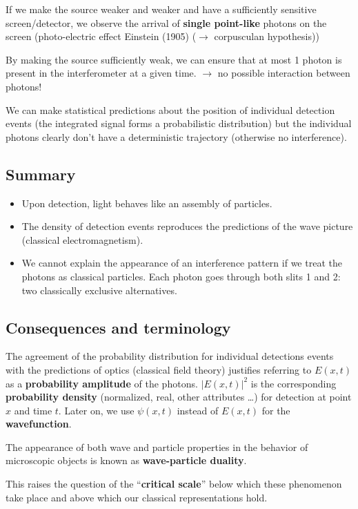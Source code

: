 \noindent
\hft

\noindent
If we make the source weaker and weaker and have a sufficiently sensitive screen/detector, we observe the arrival of \textbf{single point-like} photons on the screen (photo-electric effect Einstein (1905) ($ \to $ corpusculan hypothesis))\par
By making the source sufficiently weak, we can ensure that at most 1 photon is present in the interferometer at a given time. $ \rightarrow $ no possible interaction between photons!\par
\begin{center}
\end{center}
We can make statistical predictions about the position of individual detection events (the integrated signal forms a probabilistic distribution) but the individual photons clearly don't have a deterministic trajectory (otherwise no interference).

\subsection*{Summary}

\begin{itemize}
	\item Upon detection, light behaves like an assembly of particles.
	\item The density of detection events reproduces the predictions of the wave picture (classical electromagnetism).
	\item We cannot explain the appearance of an interference pattern if we treat the photons as classical particles. Each photon goes through both slits 1 and 2: two classically exclusive alternatives.
\end{itemize}

\subsection{Consequences and terminology}

The agreement of the probability distribution for individual detections events with the predictions of optics (classical field theory) justifies referring to $ E(x,t) $ as a \textbf{probability amplitude} of the photons. $ |E(x,t)|^2 $ is the corresponding \textbf{probability density} (normalized, real, other attributes \dots) for detection at point $ x $ and time $ t $. Later on, we use $ \psi(x,t) $ instead of $ E(x,t) $ for the \textbf{wavefunction}.\par
The appearance of both wave and particle properties in the behavior of microscopic objects is known as \textbf{wave-particle duality}.\par
This raises the question of the ``\textbf{critical scale}'' below which these phenomenon take place and above which our classical representations hold.

